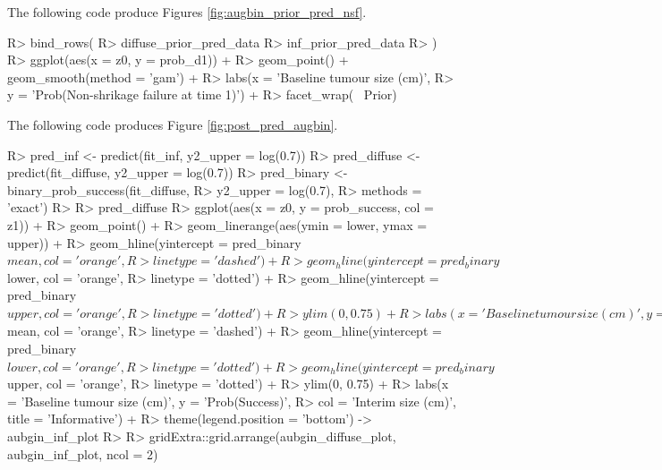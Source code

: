 \documentclass[article]{jss}
\begin{document}
The following code produce Figures \ref{fig:augbin_prior_pred_nsf}.

\begin{CodeChunk}

\begin{CodeInput}
R> bind_rows(
R>   diffuse_prior_pred_data %
R>   inf_prior_pred_data %
R> ) %
R>   ggplot(aes(x = z0, y = prob_d1)) + 
R>   geom_point() + geom_smooth(method = 'gam') +
R>   labs(x = 'Baseline tumour size (cm)', 
R>        y = 'Prob(Non-shrikage failure at time 1)') + 
R>   facet_wrap(~ Prior)
\end{CodeInput}
\end{CodeChunk}

The following code produces Figure \ref{fig:post_pred_augbin}.

\begin{CodeChunk}

\begin{CodeInput}
R> pred_inf <- predict(fit_inf, y2_upper = log(0.7))
R> pred_diffuse <- predict(fit_diffuse, y2_upper = log(0.7))
R> pred_binary <- binary_prob_success(fit_diffuse, 
R>                                    y2_upper = log(0.7), 
R>                                    methods = 'exact')
R> 
R> pred_diffuse %
R>   ggplot(aes(x = z0, y = prob_success, col = z1)) + 
R>   geom_point() + 
R>   geom_linerange(aes(ymin = lower, ymax = upper)) + 
R>   geom_hline(yintercept = pred_binary$mean, col = 'orange', 
R>              linetype = 'dashed') +
R>   geom_hline(yintercept = pred_binary$lower, col = 'orange', 
R>              linetype = 'dotted') +
R>   geom_hline(yintercept = pred_binary$upper, col = 'orange', 
R>              linetype = 'dotted') +
R>   ylim(0, 0.75) + 
R>   labs(x = 'Baseline tumour size (cm)', y = 'Prob(Success)', 
R>        col = 'Interim size (cm)', title = 'Diffuse') + 
R>   theme(legend.position = 'bottom') -> aubgin_diffuse_plot
R> 
R> pred_inf %
R>   ggplot(aes(x = z0, y = prob_success, col = z1)) + 
R>   geom_point() + 
R>   geom_linerange(aes(ymin = lower, ymax = upper)) + 
R>   geom_hline(yintercept = pred_binary$mean, col = 'orange', 
R>              linetype = 'dashed') +
R>   geom_hline(yintercept = pred_binary$lower, col = 'orange', 
R>              linetype = 'dotted') +
R>   geom_hline(yintercept = pred_binary$upper, col = 'orange', 
R>              linetype = 'dotted') +
R>   ylim(0, 0.75) + 
R>   labs(x = 'Baseline tumour size (cm)', y = 'Prob(Success)', 
R>        col = 'Interim size (cm)', title = 'Informative') + 
R>   theme(legend.position = 'bottom') -> aubgin_inf_plot
R> 
R> gridExtra::grid.arrange(aubgin_diffuse_plot, aubgin_inf_plot, ncol = 2)
\end{CodeInput}
\end{CodeChunk}


\end{document}

